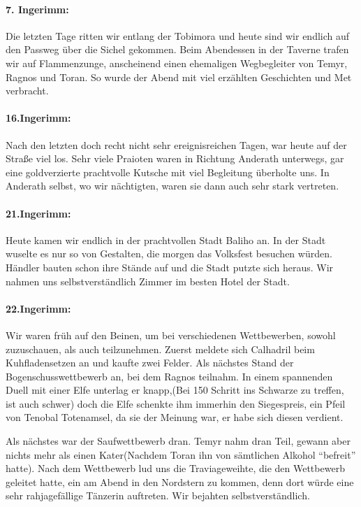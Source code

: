 \paragraph{7. Ingerimm:}
Die letzten Tage ritten wir entlang der Tobimora und heute sind wir endlich auf den Passweg über die Sichel gekommen. Beim Abendessen in der Taverne trafen wir auf Flammenzunge, anscheinend einen ehemaligen Wegbegleiter von Temyr, Ragnos und Toran. So wurde der Abend mit viel erzählten Geschichten und Met verbracht.

\paragraph{16.Ingerimm:}
Nach den letzten doch recht nicht sehr ereignisreichen Tagen, war heute auf der Straße viel los. Sehr viele Praioten waren in Richtung Anderath unterwegs, gar eine goldverzierte prachtvolle Kutsche mit viel Begleitung überholte uns. In Anderath selbst, wo wir nächtigten, waren sie dann auch sehr stark vertreten.

\paragraph{21.Ingerimm:}
Heute kamen wir endlich in der prachtvollen Stadt Baliho an. In der Stadt wuselte es nur so von Gestalten, die morgen das Volksfest besuchen würden. Händler bauten schon ihre Stände auf und die Stadt putzte sich heraus. Wir nahmen uns selbstverständlich Zimmer im besten Hotel der Stadt.

\paragraph{22.Ingerimm:}
Wir waren früh auf den Beinen, um bei verschiedenen Wettbewerben, sowohl zuzuschauen, als auch teilzunehmen. Zuerst meldete sich Calhadril beim Kuhfladensetzen an und kaufte zwei Felder. Als nächstes Stand der Bogenschusswettbewerb an, bei dem Ragnos teilnahm. In einem spannenden Duell mit einer Elfe unterlag er knapp,(Bei 150 Schritt ins Schwarze zu treffen, ist auch schwer) doch die Elfe schenkte ihm immerhin den Siegespreis, ein Pfeil von Tenobal Totenamsel, da sie der Meinung war, er habe sich diesen verdient.

Als nächstes war der Saufwettbewerb dran. Temyr nahm dran Teil, gewann aber nichts mehr als einen Kater(Nachdem Toran ihn von sämtlichen Alkohol ``befreit'' hatte). Nach dem Wettbewerb lud uns die Traviageweihte, die den Wettbewerb geleitet hatte, ein am Abend in den Nordstern zu kommen, denn dort würde eine sehr rahjagefällige Tänzerin auftreten. Wir bejahten selbstverständlich.

